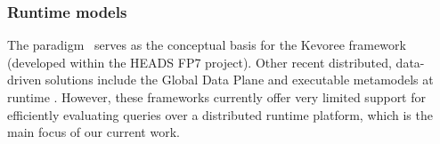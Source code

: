 \subsubsection{Runtime models} 
The \mrt paradigm~\cite{DBLP:journals/computer/BlairBF09} serves as the conceptual basis for the Kevoree framework~\cite{Morin2014} (developed within the HEADS FP7 project). Other recent distributed, data-driven solutions include the Global Data Plane \cite{Zhang2015} and executable metamodels at runtime \cite{Vogel2014}. However, these frameworks currently offer very limited support for efficiently evaluating queries over a distributed runtime platform, which is the main focus of our current work.







